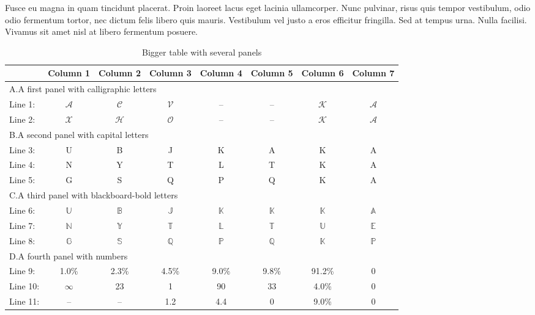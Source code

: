 Fusce eu magna in quam tincidunt placerat. Proin laoreet lacus eget lacinia ullamcorper. Nunc pulvinar, risus quis tempor vestibulum, odio odio fermentum tortor, nec dictum felis libero quis mauris. Vestibulum vel justo a eros efficitur fringilla. Sed at tempus urna. Nulla facilisi. Vivamus sit amet nisl at libero fermentum posuere.


\begin{table}[t]
\caption{Bigger table with several panels}
\begin{tabular*}{\textwidth}[]{p{2cm}@{\extracolsep\fill}ccccccc}
\toprule
    & Column 1 &  Column 2 &  Column 3  &  Column 4 &  Column 5 &  Column 6 &  Column 7 \\
\midrule
\multicolumn{8}{l}{A.\quad A first panel with calligraphic letters}\\
Line 1: & $\mathcal{A}$ & $\mathcal{C}$ & $\mathcal{V}$  & -- & -- & $\mathcal{K}$ & $\mathcal{A}$\\
Line 2: & $\mathcal{X}$ &  $\mathcal{H}$ & $\mathcal{O}$  & -- & -- & $\mathcal{K}$ & $\mathcal{A}$  \\
\midrule
\multicolumn{8}{l}{B.\quad A second panel with capital letters}\\
Line 3: & U & B & J  & K & A & K & A\\
Line 4: & N & Y & T  & L & T & K & A\\
Line 5: & G & S & Q  & P & Q & K & A\\
\midrule
\multicolumn{8}{l}{C.\quad A third panel with blackboard-bold letters}\\
Line 6: & $\mathbb{U}$ & $\mathbb{B}$ & $\mathbb{J}$  & $\mathbb{K}$ & $\mathbb{K}$ & $\mathbb{K}$ & $\mathbb{A}$\\
Line 7: & $\mathbb{N}$ & $\mathbb{Y}$ & $\mathbb{T}$  & $\mathbb{L}$ & $\mathbb{T}$ & $\mathbb{U}$ & $\mathbb{E}$\\
Line 8: & $\mathbb{G}$ & $\mathbb{S}$ & $\mathbb{Q}$  & $\mathbb{P}$ & $\mathbb{Q}$ & $\mathbb{K}$ & $\mathbb{P}$\\
\midrule
\multicolumn{8}{l}{D.\quad A fourth panel with numbers}\\
Line 9: & 1.0\% & 2.3\% & 4.5\%  & 9.0\% & 9.8\% & 91.2\% & 0\\
Line 10: & $\infty$ & 23 & 1 & 90 & 33 & 4.0\% & 0\\
Line 11: & -- & -- & 1.2  & 4.4 & 0 & 9.0\% & 0\\
\bottomrule
\end{tabular*}
\label{t:table2}\end{table}

